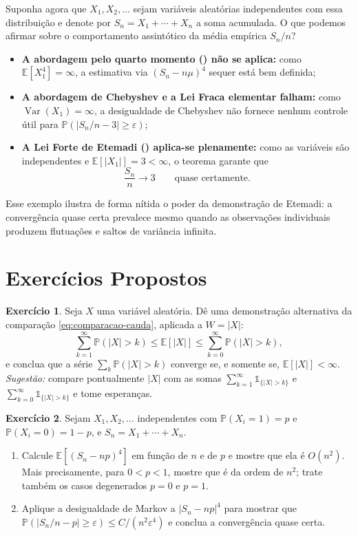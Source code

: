 \documentclass[12pt,portuguese]{article}
\theoremstyle{definition}
\theoremstyle{plainexercise}
\newtheorem{exercise}{Exercício}
\theoremstyle{starredexercise}
\theoremstyle{definition}
\begin{document}
Suponha agora que $X_1,X_2,\ldots$ sejam variáveis aleatórias independentes com
essa distribuição e denote por $S_n=X_1+\cdots+X_n$ a soma acumulada. O que
podemos afirmar sobre o comportamento assintótico da média empírica $S_n/n$?
\begin{itemize}
\item \textbf{A abordagem pelo quarto momento () não se
aplica:} como $\mathbb{E}[X_1^4]=\infty$, a estimativa via $(S_n-n\mu)^4$ sequer
está bem definida;
\item \textbf{A abordagem de Chebyshev e a Lei Fraca elementar falham:}
como $\operatorname{Var}(X_1)=\infty$, a desigualdade de Chebyshev não fornece
nenhum controle útil para $\mathbb{P}(|S_n/n-3|\geqslant\varepsilon)$;
\item \textbf{A Lei Forte de Etemadi () aplica-se
plenamente:} como as variáveis são independentes e $\mathbb{E}[|X_1|]=3<\infty$,
o teorema garante que
\begin{equation}\label{eq:convergencia-pareto}
\frac{S_n}{n}\longrightarrow 3
\qquad\text{quase certamente.}
\end{equation}
\end{itemize}
Esse exemplo ilustra de forma nítida o poder da demonstração de Etemadi: a
convergência quase certa prevalece mesmo quando as observações individuais
produzem flutuações e saltos de variância infinita.

\section{Exercícios Propostos}\label{sec:exercicios}

\begin{exercise}\label{exercise:cauda-serie}
Seja $X$ uma variável aleatória. Dê uma demonstração alternativa da comparação
\eqref{eq:comparacao-cauda}, aplicada a $W=|X|$:
\[
\sum_{k=1}^{\infty}\mathbb{P}(|X|>k)
\leqslant
\mathbb{E}[|X|]
\leqslant
\sum_{k=0}^{\infty}\mathbb{P}(|X|>k),
\]
e conclua que a série $\sum_k\mathbb{P}(|X|>k)$ converge se, e somente se,
$\mathbb{E}[|X|]<\infty$. \emph{Sugestão:} compare pontualmente $|X|$ com as
somas $\sum_{k=1}^{\infty}\mathds{1}_{\{|X|>k\}}$ e
$\sum_{k=0}^{\infty}\mathds{1}_{\{|X|>k\}}$ e tome esperanças.
\end{exercise}

\begin{exercise}\label{exercise:bernoulli-l4}
Sejam $X_1,X_2,\ldots$ independentes com $\mathbb{P}(X_i=1)=p$ e
$\mathbb{P}(X_i=0)=1-p$, e $S_n=X_1+\cdots+X_n$.
\begin{enumerate}
\item[(a)] Calcule $\mathbb{E}[(S_n-np)^4]$ em função de $n$ e de $p$ e mostre
que ela é $O(n^2)$. Mais precisamente, para $0<p<1$, mostre que é da ordem de
$n^2$; trate também os casos degenerados $p=0$ e $p=1$.
\item[(b)] Aplique a desigualdade de Markov a $|S_n-np|^4$ para mostrar que
$\mathbb{P}(|S_n/n-p|\geqslant\varepsilon)\leqslant C/(n^2\varepsilon^4)$ e
conclua a convergência quase certa.
\end{enumerate}
\end{exercise}
\end{document}
